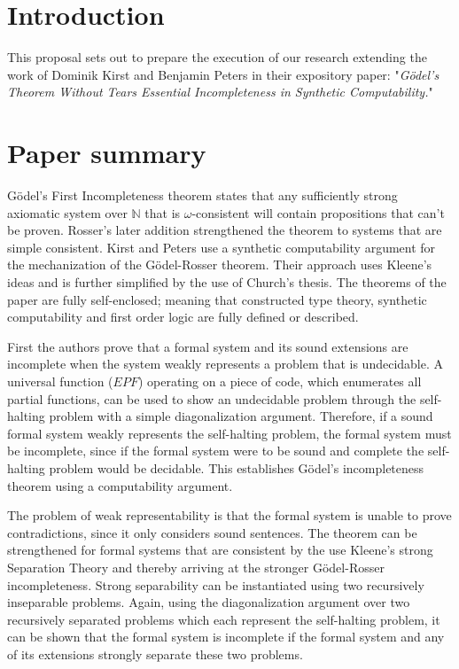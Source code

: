 \documentclass[a4paper]{scrartcl}
\begin{document}
\maketitle
\section{Introduction}
This proposal sets out to prepare the execution of our research extending the work of Dominik Kirst and Benjamin Peters in their expository paper: "\textit{Gödel’s Theorem Without Tears Essential Incompleteness in Synthetic Computability.}"\cite{kirst_et_al:LIPIcs.CSL.2023.30,} 

\section{Paper summary}
\label{sec:summary}

Gödel's First Incompleteness theorem states that any sufficiently strong axiomatic system over $\mathbb{N}$ that is $\omega$-consistent will contain propositions that can't be proven. Rosser's later addition strengthened the theorem to systems that are simple consistent. Kirst and Peters use a synthetic computability argument for the mechanization of the Gödel-Rosser theorem.\cite{kirst_et_al:LIPIcs.CSL.2023.30} Their approach uses Kleene's ideas and is further simplified by the use of Church's thesis. The theorems of the paper are fully self-enclosed; meaning that constructed type theory, synthetic computability and first order logic are fully defined or described. 

First the authors prove that a formal system and its sound extensions are incomplete when the system weakly represents a problem that is undecidable. A universal function ($EPF$) operating on a piece of code, which enumerates all partial functions, can be used to show an undecidable problem through the self-halting problem with a simple diagonalization argument. Therefore, if a sound formal system weakly represents the self-halting problem, the formal system must be incomplete, since if the formal system were to be sound and complete the self-halting problem would be decidable. This establishes Gödel's incompleteness theorem using a computability argument.

The problem of weak representability is that the formal system is unable to prove contradictions, since it only considers sound sentences. The theorem can be strengthened for formal systems that are consistent by the use Kleene's strong Separation Theory and thereby arriving at the stronger Gödel-Rosser incompleteness. Strong separability can be instantiated using two recursively inseparable problems. Again, using the diagonalization argument over two recursively separated problems which each represent the self-halting problem, it can be shown that the formal system is incomplete if the formal system and any of its extensions strongly separate these two problems.
\end{document}
